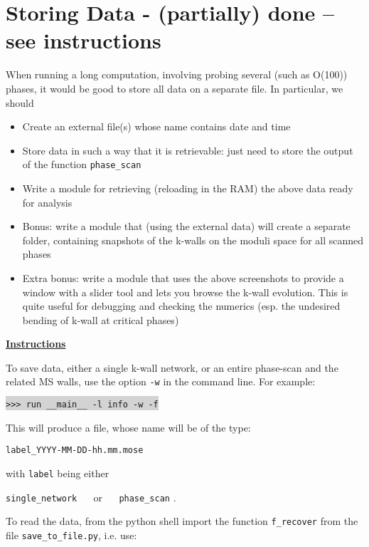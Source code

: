 \documentclass[11pt]{report}
\begin{document}
\section{Storing Data - {\color{red} \bf (partially) done -- see instructions}}
When running a long computation, involving probing several (such as O(100)) phases, it would be good to store all data on a separate file.
In particular, we should 
\begin{itemize}
	\item[\checkmark] Create an external file(s) whose name contains date and time
	\item[\checkmark] Store data in such a way that it is retrievable: just need to store the output of the function {\texttt{phase\_scan}}
	\item[\checkmark] Write a module for retrieving (reloading in the RAM) the above data ready for analysis
	\item Bonus: write a module that (using the external data) will create a separate folder, containing snapshots of the k-walls on the moduli space for all scanned phases
	\item Extra bonus: write a module that uses the above screenshots to provide a window with a slider tool and lets you browse the k-wall evolution. This is quite useful for debugging and checking the numerics (esp. the undesired bending of k-wall at critical phases)
\end{itemize}

\medskip


{\color{red} \bf \Large\underline{Instructions}}

To save data, either a single k-wall network, or an entire phase-scan and the related MS walls, use the option {\tt -w} in the command line. 
For example:

\smallskip

\indent \colorbox{lightgray}{\tt>>> run \_\_main\_\_ -l info -w -f} 

\smallskip


This will produce a file, whose name will be of the type:
\begin{center}
{\tt label\_YYYY-MM-DD-hh.mm.mose} 
\end{center}
with {\tt label} being either
\begin{center}
{\tt single\_network} $\quad$ or $\quad$  {\tt phase\_scan} .
\end{center}

To read the data, from the python shell import the function {\tt f\_{recover}} from the file {\tt save\_to\_file.py}, i.e. use:
\end{document}
